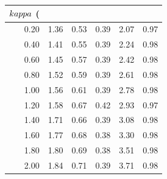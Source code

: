 \begin{tabular}{rrrrrr}
\toprule
$\\kappa$ (\\%
\midrule
0.20 & 1.36 & 0.53 & 0.39 & 2.07 & 0.97 \\
0.40 & 1.41 & 0.55 & 0.39 & 2.24 & 0.98 \\
0.60 & 1.45 & 0.57 & 0.39 & 2.42 & 0.98 \\
0.80 & 1.52 & 0.59 & 0.39 & 2.61 & 0.98 \\
1.00 & 1.56 & 0.61 & 0.39 & 2.78 & 0.98 \\
1.20 & 1.58 & 0.67 & 0.42 & 2.93 & 0.97 \\
1.40 & 1.71 & 0.66 & 0.39 & 3.08 & 0.98 \\
1.60 & 1.77 & 0.68 & 0.38 & 3.30 & 0.98 \\
1.80 & 1.80 & 0.69 & 0.38 & 3.51 & 0.98 \\
2.00 & 1.84 & 0.71 & 0.39 & 3.71 & 0.98 \\
\bottomrule
\end{tabular}

